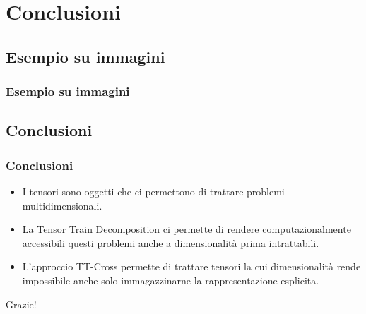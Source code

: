 \documentclass[compress]{beamer}
\theoremstyle{definition}
\theoremstyle{plain}
\begin{document}
\section{Conclusioni}
\subsection{Esempio su immagini}
\begin{frame}
\frametitle{Esempio su immagini}
\begin{center}
\end{center}
\end{frame}

\subsection{Conclusioni}
\begin{frame}
\frametitle{Conclusioni}
\begin{itemize}
	\item I tensori sono oggetti che ci permettono di trattare problemi multidimensionali.
	\item La Tensor Train Decomposition ci permette di rendere computazionalmente accessibili questi problemi anche a dimensionalità prima intrattabili.
	\item L'approccio TT-Cross permette di trattare tensori la cui dimensionalità rende impossibile anche solo immagazzinarne la rappresentazione esplicita.
\end{itemize}

\pause
\vspace{2mm}
\begin{center}
	\Huge Grazie!
\end{center}
\end{frame}

\end{document}
